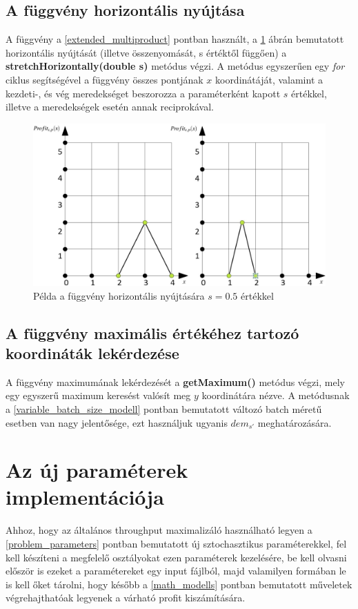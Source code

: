 \subsection{A függvény horizontális nyújtása}
A függvény a \ref{extended_multiproduct} pontban használt, a \ref{profit_func_stretch} ábrán bemutatott horizontális nyújtását (illetve összenyomását, s értéktől függően) a \textbf{stretchHorizontally(double s)} metódus végzi. A metódus egyszerűen egy \textit{for} ciklus segítségével a függvény összes pontjának $x$ koordinátáját, valamint a kezdeti-, és vég meredekséget beszorozza a paraméterként kapott $s$ értékkel, illetve a meredekségek esetén annak reciprokával. 
\begin{figure}
\begin{center}
\includegraphics[scale=0.4]{profit_func_stretch}
\caption{Példa a függvény horizontális nyújtására $s=0.5$ értékkel}
\label{profit_func_stretch}
\end{center}
\end{figure}
\subsection{A függvény maximális értékéhez tartozó koordináták lekérdezése}
A függvény maximumának lekérdezését a \textbf{getMaximum()} metódus végzi, mely egy egyszerű maximum keresést valósít meg $y$ koordinátára nézve. A metódusnak a \ref{variable_batch_size_modell} pontban bemutatott változó batch méretű esetben van nagy jelentősége, ezt használjuk ugyanis $dem_{s'}$ meghatározására.
\section{Az új paraméterek implementációja}
Ahhoz, hogy az általános throughput maximalizáló használható legyen a \ref{problem_parameters} pontban bemutatott új sztochasztikus paraméterekkel, fel kell készíteni a megfelelő osztályokat ezen paraméterek kezelésére, be kell olvasni először is ezeket a paramétereket egy input fájlból, majd valamilyen formában le is kell őket tárolni, hogy később a \ref{math_modells} pontban bemutatott műveletek végrehajthatóak legyenek a várható profit kiszámítására.

